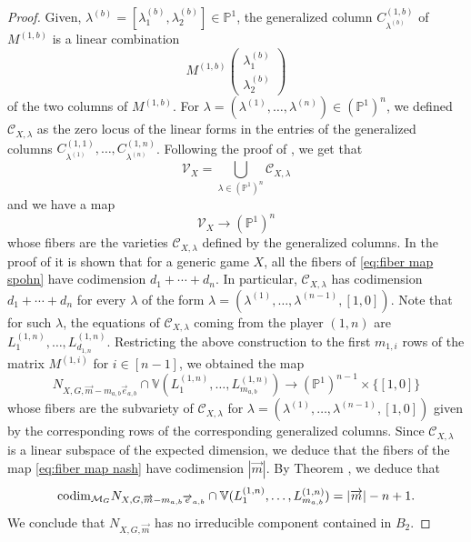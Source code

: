 \documentclass[11pt]{amsart}
\numberwithin{equation}{section}
\theoremstyle{plain}
\numberwithin{theorem}{section}
\theoremstyle{definition}
\newcommand{\PP}{{\mathbb P}}
\def\codim{{\rm codim}}
\begin{document}
\begin{proof}
Given, $\lambda^{(b)} = [\lambda_1^{(b)},\lambda_2^{(b)}]\in\PP^1$, the generalized column $C^{(1,b)}_{\lambda^{(b)}}$ of $M^{(1,b)}$ is a linear combination 
\[
M^{(1,b)}\begin{pmatrix}
    \lambda_1^{(b)} \\ \lambda_2^{(b)}
\end{pmatrix}
\]
of the two columns of $M^{(1,b)}$. For $\lambda=(\lambda^{(1)},\ldots,\lambda^{(n)})\in (\PP^1)^n$, 
we defined $\mathcal{C}_{X,\lambda}$ as the zero locus of the linear forms in the entries of the generalized columns $C^{(1,1)}_{\lambda^{(1)}},\ldots, C^{(1,n)}_{\lambda^{(n)}}$.
Following the proof of \cite[Theorem 6.4]{eisenbud2006geometry}, we get that 
\[
\mathcal{V}_{X}=\bigcup_{\lambda\in (\PP^1)^n}\mathcal{C}_{X,\lambda}
\]
and we have a map 
\begin{equation}\label{eq:fiber map spohn}
\mathcal{V}_{X} \longrightarrow (\PP^1)^n
\end{equation}
whose fibers are the varieties $\mathcal{C}_{X,\lambda}$ defined by the generalized columns.
In the proof of \cite[Theorem 6]{portakal2022geometry} it is shown that for a generic game $X$, all the fibers of \eqref{eq:fiber map spohn} have codimension $d_1+\cdots+d_n$. In particular, $\mathcal{C}_{X,\lambda}$ has codimension $d_1+\cdots+d_n$ for every $\lambda$ of the form $\lambda=(\lambda^{(1)},\ldots,\lambda^{(n-1)},[1,0])$. Note that for such $\lambda$, the equations of $\mathcal{C}_{X,\lambda}$ coming from the player $(1,n)$ are $L_1^{(1,n)},\ldots,L_{d_{1,n}}^{(1,n)}$. Restricting the above construction to the first $m_{1,i}$ rows of the matrix $M^{(1,i)}$ for $i\in[n-1]$, we obtained the map 
\begin{equation}\label{eq:fiber map nash}
N_{X,G,\overrightarrow{m}-m_{a,b}\overrightarrow{e}_{a,b}}\cap \mathbb{V}(L^{(1,n)}_1,\ldots,L^{(1,n)}_{m_{a,b}})\longrightarrow (\PP^1)^{n-1}\times\{[1,0]\}
\end{equation}
whose fibers are the subvariety of  $\mathcal{C}_{X,\lambda}$ for  $\lambda=(\lambda^{(1)},\ldots,\lambda^{(n-1)},[1,0])$ given by the corresponding rows of the corresponding generalized columns. Since  $\mathcal{C}_{X,\lambda}$ is a linear subspace of the expected dimension, we deduce that the fibers of the map \eqref{eq:fiber map nash} have codimension $|\overrightarrow{m}|$. By Theorem \cite[Theorem 11.12]{harris2013algebraic}, we deduce that 
\[
\codim_{\mathcal{M}_G} N_{X,G,\overrightarrow{m}-m_{a,b}\overrightarrow{e}_{a,b}}\cap \mathbb{V}(L^{(1,n)}_1,\ldots,L^{(1,n)}_{m_{a,b}}) = |\overrightarrow{m}|-n+1.
\]
We conclude that $ N_{X,G,\overrightarrow{m}}$ has no irreducible component contained in 
$B_2$.


\end{proof}
\end{document}
